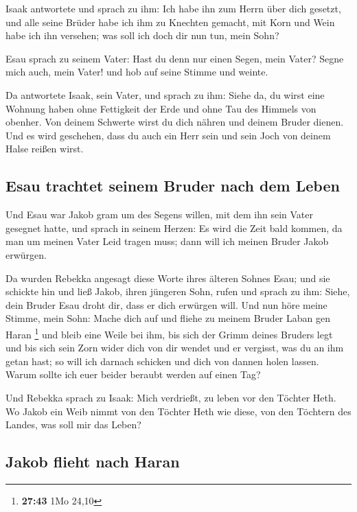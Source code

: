  Isaak antwortete und sprach zu ihm: Ich habe ihn zum
Herrn über dich gesetzt, und alle seine Brüder habe ich ihm zu Knechten
gemacht, mit Korn und Wein habe ich ihn versehen; was soll ich doch dir
nun tun, mein Sohn?

 Esau sprach zu seinem Vater: Hast du denn nur einen
Segen, mein Vater? Segne mich auch, mein Vater! und hob auf seine Stimme
und weinte.

 Da antwortete Isaak, sein Vater, und sprach zu ihm:
Siehe da, du wirst eine Wohnung haben ohne Fettigkeit der Erde und ohne
Tau des Himmels von obenher.  Von deinem Schwerte wirst
du dich nähren und deinem Bruder dienen. Und es wird geschehen, dass du
auch ein Herr sein und sein Joch von deinem Halse reißen wirst.

\hypertarget{esau-trachtet-seinem-bruder-nach-dem-leben}{%
\subsection{Esau trachtet seinem Bruder nach dem
Leben}\label{esau-trachtet-seinem-bruder-nach-dem-leben}}

 Und Esau war Jakob gram um des Segens willen, mit dem
ihn sein Vater gesegnet hatte, und sprach in seinem Herzen: Es wird die
Zeit bald kommen, da man um meinen Vater Leid tragen muss; dann will ich
meinen Bruder Jakob erwürgen.

 Da wurden Rebekka angesagt diese Worte ihres älteren
Sohnes Esau; und sie schickte hin und ließ Jakob, ihren jüngeren Sohn,
rufen und sprach zu ihm: Siehe, dein Bruder Esau droht dir, dass er dich
erwürgen will.  Und nun höre meine Stimme, mein Sohn:
Mache dich auf und fliehe zu meinem Bruder Laban gen Haran \footnote{\textbf{27:43}
  1Mo 24,10}  und bleib eine Weile bei ihm, bis sich der
Grimm deines Bruders legt  und bis sich sein Zorn wider
dich von dir wendet und er vergisst, was du an ihm getan hast; so will
ich darnach schicken und dich von dannen holen lassen. Warum sollte ich
euer beider beraubt werden auf einen Tag?

 Und Rebekka sprach zu Isaak: Mich verdrießt, zu leben
vor den Töchter Heth. Wo Jakob ein Weib nimmt von den Töchter Heth wie
diese, von den Töchtern des Landes, was soll mir das Leben?

\hypertarget{jakob-flieht-nach-haran}{%
\subsection{Jakob flieht nach Haran}\label{jakob-flieht-nach-haran}}

